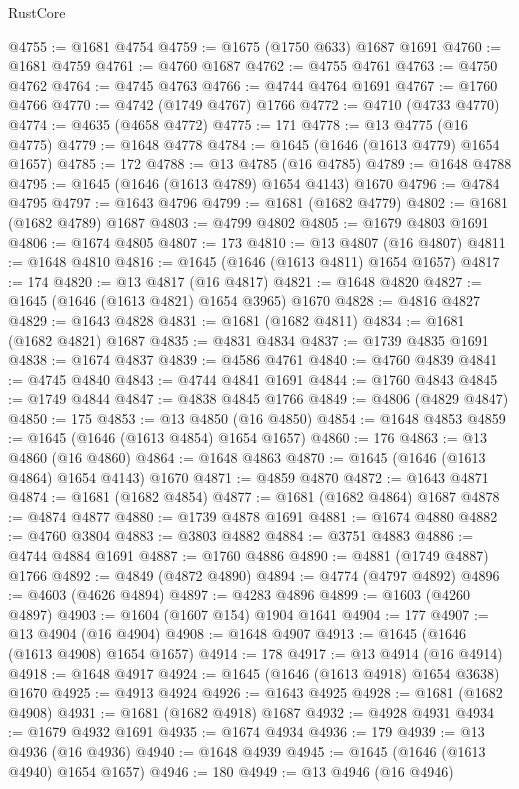 \begin{lexlean}{RustCore}
\begin{coremodule}
@4755 := @1681 @4754
@4759 := @1675 (@1750 @633) @1687 @1691
@4760 := @1681 @4759
@4761 := @4760 @1687
@4762 := @4755 @4761
@4763 := @4750 @4762
@4764 := @4745 @4763
@4766 := @4744 @4764 @1691
@4767 := @1760 @4766
@4770 := @4742 (@1749 @4767) @1766
@4772 := @4710 (@4733 @4770)
@4774 := @4635 (@4658 @4772)
@4775 := 171
@4778 := @13 @4775 (@16 @4775)
@4779 := @1648 @4778
@4784 := @1645 (@1646 (@1613 @4779) @1654 @1657)
@4785 := 172
@4788 := @13 @4785 (@16 @4785)
@4789 := @1648 @4788
@4795 := @1645 (@1646 (@1613 @4789) @1654 @4143) @1670
@4796 := @4784 @4795
@4797 := @1643 @4796
@4799 := @1681 (@1682 @4779)
@4802 := @1681 (@1682 @4789) @1687
@4803 := @4799 @4802
@4805 := @1679 @4803 @1691
@4806 := @1674 @4805
@4807 := 173
@4810 := @13 @4807 (@16 @4807)
@4811 := @1648 @4810
@4816 := @1645 (@1646 (@1613 @4811) @1654 @1657)
@4817 := 174
@4820 := @13 @4817 (@16 @4817)
@4821 := @1648 @4820
@4827 := @1645 (@1646 (@1613 @4821) @1654 @3965) @1670
@4828 := @4816 @4827
@4829 := @1643 @4828
@4831 := @1681 (@1682 @4811)
@4834 := @1681 (@1682 @4821) @1687
@4835 := @4831 @4834
@4837 := @1739 @4835 @1691
@4838 := @1674 @4837
@4839 := @4586 @4761
@4840 := @4760 @4839
@4841 := @4745 @4840
@4843 := @4744 @4841 @1691
@4844 := @1760 @4843
@4845 := @1749 @4844
@4847 := @4838 @4845 @1766
@4849 := @4806 (@4829 @4847)
@4850 := 175
@4853 := @13 @4850 (@16 @4850)
@4854 := @1648 @4853
@4859 := @1645 (@1646 (@1613 @4854) @1654 @1657)
@4860 := 176
@4863 := @13 @4860 (@16 @4860)
@4864 := @1648 @4863
@4870 := @1645 (@1646 (@1613 @4864) @1654 @4143) @1670
@4871 := @4859 @4870
@4872 := @1643 @4871
@4874 := @1681 (@1682 @4854)
@4877 := @1681 (@1682 @4864) @1687
@4878 := @4874 @4877
@4880 := @1739 @4878 @1691
@4881 := @1674 @4880
@4882 := @4760 @3804
@4883 := @3803 @4882
@4884 := @3751 @4883
@4886 := @4744 @4884 @1691
@4887 := @1760 @4886
@4890 := @4881 (@1749 @4887) @1766
@4892 := @4849 (@4872 @4890)
@4894 := @4774 (@4797 @4892)
@4896 := @4603 (@4626 @4894)
@4897 := @4283 @4896
@4899 := @1603 (@4260 @4897)
@4903 := @1604 (@1607 @154) @1904 @1641
@4904 := 177
@4907 := @13 @4904 (@16 @4904)
@4908 := @1648 @4907
@4913 := @1645 (@1646 (@1613 @4908) @1654 @1657)
@4914 := 178
@4917 := @13 @4914 (@16 @4914)
@4918 := @1648 @4917
@4924 := @1645 (@1646 (@1613 @4918) @1654 @3638) @1670
@4925 := @4913 @4924
@4926 := @1643 @4925
@4928 := @1681 (@1682 @4908)
@4931 := @1681 (@1682 @4918) @1687
@4932 := @4928 @4931
@4934 := @1679 @4932 @1691
@4935 := @1674 @4934
@4936 := 179
@4939 := @13 @4936 (@16 @4936)
@4940 := @1648 @4939
@4945 := @1645 (@1646 (@1613 @4940) @1654 @1657)
@4946 := 180
@4949 := @13 @4946 (@16 @4946)

\end{coremodule}
\end{lexlean}
